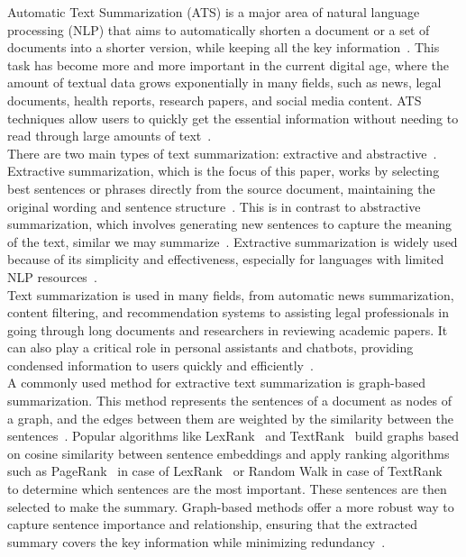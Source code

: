 Automatic Text Summarization (ATS) is a major area of natural language processing (NLP) that aims
to automatically shorten a document or a set of documents into a shorter version, while keeping all
the key information~\cite{Widyassari-2022-rev-ats-tech-met}.
This task has become more and more important in the current digital age, where the amount of textual
data grows exponentially in many fields, such as news, legal documents, health reports, research papers,
and social media content.
ATS techniques allow users to quickly get the essential information without needing to read through large
amounts of text~\cite{wafaa-2021-summary-comprehensive-review}.\\

There are two main types of text summarization: extractive and abstractive~\cite{tas-2017-rev-text-sum-2}.
Extractive summarization, which is the focus of this paper, works by selecting best sentences or phrases directly
from the source document, maintaining the original wording and sentence structure~\cite{moratanch-2017-extractive-review}.
This is in contrast to abstractive summarization, which involves generating new sentences to capture the meaning of the
text, similar we may summarize~\cite{Moratanch-2016-abstractive-rev}.
Extractive summarization is widely used because of its simplicity and effectiveness, especially for languages with
limited NLP resources~\cite{gupta-2010-extractive-rev}.\\

Text summarization is used in many fields, from automatic news summarization, content filtering, and recommendation
systems to assisting legal professionals in going through long documents and researchers in reviewing academic papers.
It can also play a critical role in personal assistants and chatbots, providing condensed information to users quickly
and efficiently~\cite{tas-2017-rev-text-sum-2}.\\

A commonly used method for extractive text summarization is graph-based summarization.
This method represents the sentences of a document as nodes of a graph, and the edges between them are weighted by the
similarity between the sentences~\cite{wafaa-2021-summary-comprehensive-review}.
Popular algorithms like LexRank~\cite{Erkan-lexRank-2004} and TextRank~\cite{mihalcea-2004-textrank} build graphs based
on cosine similarity between sentence embeddings and apply ranking algorithms such as PageRank~\cite{page-PageRank-1999} in
case of LexRank~\cite{Erkan-lexRank-2004} or Random Walk in case of TextRank~\cite{mihalcea-2004-textrank} to
determine which sentences are the most important.
These sentences are then selected to make the summary.
Graph-based methods offer a more robust way to capture sentence importance and relationship, ensuring that the
extracted summary covers the key information while minimizing redundancy~\cite{wafaa-2021-summary-comprehensive-review}.\\

